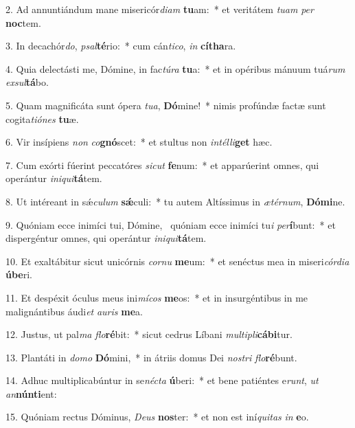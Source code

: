 2. Ad annuntiándum mane misericór\textit{di}\textit{am} \textbf{tu}am:~*  et veritátem \textit{tu}\textit{am} \textit{per} \textbf{noc}tem.\

3. In decachór\textit{do}, \textit{psal}\textbf{té}rio:~*  cum cán\textit{ti}\textit{co}, \textit{in} \textbf{cí}\textbf{tha}ra.\

4. Quia delectásti me, Dómine, in fac\textit{tú}\textit{ra} \textbf{tu}a:~*  et in opéribus mánuum tuá\textit{rum} \textit{ex}\textit{sul}\textbf{tá}bo.\

5. Quam magnificáta sunt ópera \textit{tu}\textit{a}, \textbf{Dó}mine!~*  nimis profúndæ factæ sunt cogita\textit{ti}\textit{ó}\textit{nes} \textbf{tu}æ.\

6. Vir insípiens \textit{non} \textit{co}\textbf{gnó}scet:~*  et stultus non \textit{in}\textit{tél}\textit{li}\textbf{get} hæc.\

7. Cum exórti fúerint peccatóres \textit{sic}\textit{ut} \textbf{fe}num:~*  et apparúerint omnes, qui operántur \textit{in}\textit{i}\textit{qui}\textbf{tá}tem.\

8. Ut intéreant in sǽ\textit{cu}\textit{lum} \textbf{sǽ}culi:~*  tu autem Altíssimus in \textit{æ}\textit{tér}\textit{num}, \textbf{Dó}\textbf{mi}ne.\

9. Quóniam ecce inimíci tui, Dómine, \dag\  quóniam ecce inimíci tu\textit{i} \textit{per}\textbf{í}bunt:~*  et dispergéntur omnes, qui operántur \textit{in}\textit{i}\textit{qui}\textbf{tá}tem.\

10. Et exaltábitur sicut unicórnis \textit{cor}\textit{nu} \textbf{me}um:~*  et senéctus mea in miseri\textit{cór}\textit{di}\textit{a} \textbf{ú}\textbf{be}ri.\

11. Et despéxit óculus meus ini\textit{mí}\textit{cos} \textbf{me}os:~*  et in insurgéntibus in me malignántibus áudi\textit{et} \textit{au}\textit{ris} \textbf{me}a.\

12. Justus, ut pal\textit{ma} \textit{flo}\textbf{ré}bit:~*  sicut cedrus Líbani \textit{mul}\textit{ti}\textit{pli}\textbf{cá}\textbf{bi}tur.\

13. Plantáti in \textit{do}\textit{mo} \textbf{Dó}mini,~*  in átriis domus Dei \textit{nos}\textit{tri} \textit{flo}\textbf{ré}bunt.\

14. Adhuc multiplicabúntur in se\textit{néc}\textit{ta} \textbf{ú}beri:~*  et bene patiéntes e\textit{runt}, \textit{ut} \textit{an}\textbf{nún}\textbf{ti}ent:\

15. Quóniam rectus Dóminus, \textit{De}\textit{us} \textbf{nos}ter:~*  et non est iní\textit{qui}\textit{tas} \textit{in} \textbf{e}o.\

